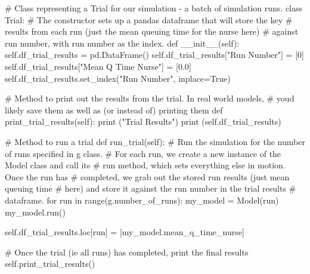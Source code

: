 \documentclass[
  letterpaper,
  DIV=11,
  numbers=noendperiod]{scrreprt}
\newenvironment{Shaded}{\begin{snugshade}}{\end{snugshade}}
\newcommand{\BuiltInTok}[1]{\textcolor[rgb]{0.00,0.23,0.31}{#1}}
\newcommand{\CommentTok}[1]{\textcolor[rgb]{0.37,0.37,0.37}{#1}}
\newcommand{\ControlFlowTok}[1]{\textcolor[rgb]{0.00,0.23,0.31}{#1}}
\newcommand{\DecValTok}[1]{\textcolor[rgb]{0.68,0.00,0.00}{#1}}
\newcommand{\FloatTok}[1]{\textcolor[rgb]{0.68,0.00,0.00}{#1}}
\newcommand{\FunctionTok}[1]{\textcolor[rgb]{0.28,0.35,0.67}{#1}}
\newcommand{\KeywordTok}[1]{\textcolor[rgb]{0.00,0.23,0.31}{#1}}
\newcommand{\NormalTok}[1]{\textcolor[rgb]{0.00,0.23,0.31}{#1}}
\newcommand{\OperatorTok}[1]{\textcolor[rgb]{0.37,0.37,0.37}{#1}}
\newcommand{\StringTok}[1]{\textcolor[rgb]{0.13,0.47,0.30}{#1}}
\newcommand{\VariableTok}[1]{\textcolor[rgb]{0.07,0.07,0.07}{#1}}
\begin{document}
\begin{Shaded}
\begin{Highlighting}[]
\CommentTok{\# Class representing a Trial for our simulation {-} a batch of simulation runs.}
\KeywordTok{class}\NormalTok{ Trial:}
    \CommentTok{\# The constructor sets up a pandas dataframe that will store the key}
    \CommentTok{\# results from each run (just the mean queuing time for the nurse here)}
    \CommentTok{\# against run number, with run number as the index.}
    \KeywordTok{def}  \FunctionTok{\_\_init\_\_}\NormalTok{(}\VariableTok{self}\NormalTok{):}
        \VariableTok{self}\NormalTok{.df\_trial\_results }\OperatorTok{=}\NormalTok{ pd.DataFrame()}
        \VariableTok{self}\NormalTok{.df\_trial\_results[}\StringTok{"Run Number"}\NormalTok{] }\OperatorTok{=}\NormalTok{ [}\DecValTok{0}\NormalTok{]}
        \VariableTok{self}\NormalTok{.df\_trial\_results[}\StringTok{"Mean Q Time Nurse"}\NormalTok{] }\OperatorTok{=}\NormalTok{ [}\FloatTok{0.0}\NormalTok{]}
        \VariableTok{self}\NormalTok{.df\_trial\_results.set\_index(}\StringTok{"Run Number"}\NormalTok{, inplace}\OperatorTok{=}\VariableTok{True}\NormalTok{)}

    \CommentTok{\# Method to print out the results from the trial.  In real world models,}
    \CommentTok{\# you\textquotesingle{}d likely save them as well as (or instead of) printing them}
    \KeywordTok{def}\NormalTok{ print\_trial\_results(}\VariableTok{self}\NormalTok{):}
        \BuiltInTok{print}\NormalTok{ (}\StringTok{"Trial Results"}\NormalTok{)}
        \BuiltInTok{print}\NormalTok{ (}\VariableTok{self}\NormalTok{.df\_trial\_results)}

    \CommentTok{\# Method to run a trial}
    \KeywordTok{def}\NormalTok{ run\_trial(}\VariableTok{self}\NormalTok{):}
        \CommentTok{\# Run the simulation for the number of runs specified in g class.}
        \CommentTok{\# For each run, we create a new instance of the Model class and call its}
        \CommentTok{\# run method, which sets everything else in motion.  Once the run has}
        \CommentTok{\# completed, we grab out the stored run results (just mean queuing time}
        \CommentTok{\# here) and store it against the run number in the trial results}
        \CommentTok{\# dataframe.}
        \ControlFlowTok{for}\NormalTok{ run }\KeywordTok{in} \BuiltInTok{range}\NormalTok{(g.number\_of\_runs):}
\NormalTok{            my\_model }\OperatorTok{=}\NormalTok{ Model(run)}
\NormalTok{            my\_model.run()}

            \VariableTok{self}\NormalTok{.df\_trial\_results.loc[run] }\OperatorTok{=}\NormalTok{ [my\_model.mean\_q\_time\_nurse]}

        \CommentTok{\# Once the trial (ie all runs) has completed, print the final results}
        \VariableTok{self}\NormalTok{.print\_trial\_results()}
\end{Highlighting}
\end{Shaded}
\end{document}
